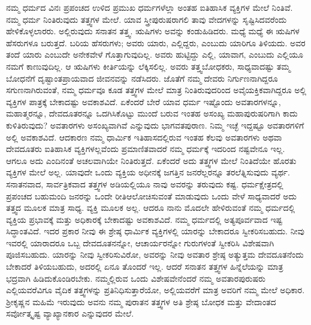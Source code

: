ನಮ್ಮ ಧರ್ಮದ ವಿನಃ ಪ್ರಪಂಚದ ಉಳಿದ ಪ್ರಮುಖ ಧರ್ಮಗಳೆಲ್ಲಾ ಅಂತಹ ಐತಿಹಾಸಿಕ ವ್ಯಕ್ತಿಗಳ ಮೇಲೆ ನಿಂತಿವೆ. ನಮ್ಮ ಧರ್ಮ ನಿಂತಿರುವುದು ತತ್ತ್ವಗಳ ಮೇಲೆ. ಯಾವ ಸ್ತ್ರೀಪುರುಷರಾಗಲಿ ತಾವು ವೇದಗಳನ್ನು ಸೃಷ್ಟಿಸಿದವರೆಂದು ಹೇಳಿಕೊಳ್ಳಲಾರರು. ಅಲ್ಲಿರುವುದು ಸನಾತನ ತತ್ತ್ವ. ಋಷಿಗಳು ಅವನ್ನು ಕಂಡುಹಿಡಿದರು. ಮಧ್ಯೆ ಮಧ್ಯೆ ಈ ಋಷಿಗಳ ಹೆಸರುಗಳೂ ಬರುತ್ತದೆ. ಬರಿಯ ಹೆಸರುಗಳು; ಅವರು ಯಾರು, ಎಲ್ಲಿದ್ದರು, ಎಂಬುದು ಯಾರಿಗೂ ತಿಳಿಯದು. ಅವರ ತಂದೆ ಯಾರು ಎಂಬುದೇ ಅನೇಕವೇಳೆ ಗೊತ್ತಾಗುವುದಿಲ್ಲ. ಅವರು ಹುಟ್ಟಿದ್ದು ಎಲ್ಲಿ, ಯಾವಾಗ, ಎಂಬುದು ಎಲ್ಲಿಯೂ ನಮಗೆ ಕಾಣುವುದಿಲ್ಲ. ಆ ಋಷಿಗಳು ಕೀರ್ತಿಯನ್ನು ಲೆಕ್ಕಿಸಲಿಲ್ಲ. ಅವರು ತತ್ತ್ವಬೋಧಕರು, ಸಾಧ್ಯವಾದಷ್ಟು ತಮ್ಮ ಬೋಧನೆಗೆ ದೃಷ್ಟಾಂತಪ್ರಾಯವಾದ ಜೀವನವನ್ನು ನಡೆಸಿದರು. ಜೊತೆಗೆ ನಮ್ಮ ದೇವರು ನಿರ್ಗುಣನಾಗಿದ್ದರೂ ಸಗುಣನಾಗಿರುವಂತೆ, ನಮ್ಮ ಧರ್ಮವೂ ಕೂಡ ತತ್ತ್ವಗಳ ಮೇಲೆ ಮಾತ್ರ ನಿಂತಿರುವುದರಿಂದ ಅವೈಯಕ್ತಿಕವಾಗಿದ್ದರೂ ಅಲ್ಲಿ ವ್ಯಕ್ತಿಗಳ ಪಾತ್ರಕ್ಕೆ ಬೇಕಾದಷ್ಟು ಅವಕಾಶವಿದೆ. ಏಕೆಂದರೆ ಬೇರೆ ಯಾವ ಧರ್ಮ ಇಷ್ಟೊಂದು ಅವತಾರಗಳನ್ನೂ, ಮಹಾತ್ಮರನ್ನೂ, ದೇವದೂತರನ್ನೂ ಒದಗಿಸಿಕೊಟ್ಟು ಮುಂದೆ ಬರುವ ಇಂತಹ ಅಸಂಖ್ಯ ಮಹಾಪುರುಷರಿಗಾಗಿ ಕಾದು ಕುಳಿತಿರುವುದು? ಅವತಾರಗಳು ಅಸಂಖ್ಯವಾಗಿವೆ ಎನ್ನುವುದು ಭಾಗವತಪುರಾಣ. ನಿಮ್ಮ ಇಚ್ಛೆ ಇದ್ದಷ್ಟೂ ಅವತಾರಗಳಿಗೆ ಅಲ್ಲಿ ಅವಕಾಶವಿದೆ. ಆದಕಾರಣ ನಮ್ಮ ಧಾರ್ಮಿಕ ಇತಿಹಾಸದಲ್ಲಿರುವ ಇಂತಹ ಕೆಲವು ಅವತಾರಗಳು ಅಥವಾ ದೇವದೂತರು ಐತಿಹಾಸಿಕ ವ್ಯಕ್ತಿಗಳಲ್ಲವೆಂದು ಪ್ರಮಾಣಿತವಾದರೆ ನಮ್ಮ ಧರ್ಮಕ್ಕೆ ಇದರಿಂದ ನಷ್ಟವೇನೂ ಇಲ್ಲ. ಆಗಲೂ ಅದು ಎಂದಿನಂತೆ ಅಚಲವಾಗಿಯೇ ನಿಂತಿರುತ್ತದೆ. ಏಕೆಂದರೆ ಅದು ತತ್ತ್ವಗಳ ಮೇಲೆ ನಿಂತಿದೆಯೇ ಹೊರತು ವ್ಯಕ್ತಿಗಳ ಮೇಲೆ ಅಲ್ಲ. ಯಾವುದೇ ಒಂದು ವ್ಯಕ್ತಿಯ ಅಧೀನಕ್ಕೆ ಜಗತ್ತಿನ ಜನರೆಲ್ಲರನ್ನೂ ತರಲೆತ್ನಿಸುವುದು ವ್ಯರ್ಥ. ಸನಾತನವಾದ, ಸಾರ್ವತ್ರಿಕವಾದ ತತ್ತ್ವಗಳ ಅಡಿಯಲ್ಲಿಯೂ ನಾವು ಅವರನ್ನು ತರುವುದು ಕಷ್ಟ. ಧರ್ಮಕ್ಷೇತ್ರದಲ್ಲಿ ಪ್ರಪಂಚದ ಬಹುಮಂದಿ ಜನರನ್ನು ಒಂದೇ ರೀತಿ\break ಆಲೋಚಿಸುವಂತೆ ಮಾಡುವುದು ಒಂದು ವೇಳೆ ಸಾಧ್ಯವಾದರೆ ಅದು ತತ್ತ್ವದ ಮೂಲಕ ಮಾತ್ರ ಸಾಧ್ಯ. ವ್ಯಕ್ತಿ ಮೂಲಕ ಅಲ್ಲ. ಆದರೂ ನಾನು ಮೊದಲೇ ಹೇಳಿರುವಂತೆ ನಮ್ಮ ಧರ್ಮದಲ್ಲಿ ವ್ಯಕ್ತಿಯ ಪ್ರಭಾವಕ್ಕೆ ಮತ್ತು ಅಧಿಕಾರಕ್ಕೆ ಬೇಕಾದಷ್ಟು ಅವಕಾಶವಿದೆ. ನಮ್ಮ ಧರ್ಮದಲ್ಲಿ ಅತ್ಯಪೂರ್ವವಾದ ಇಷ್ಟ ಸಿದ್ಧಾಂತವಿದೆ. ಇದರ ಪ್ರಕಾರ ನೀವು ಈ ಶ್ರೇಷ್ಠ ಧಾರ್ಮಿಕ ವ್ಯಕ್ತಿಗಳಲ್ಲಿ ಯಾರನ್ನು ಬೇಕಾದರೂ ಸ್ವೀಕರಿಸಬಹುದು. ನೀವು ಇವರಲ್ಲಿ ಯಾರಾದರೂ ಒಬ್ಬ ದೇವದೂತನನ್ನೋ, ಆಚಾರ್ಯರನ್ನೋ ಗುರುಗಳಂತೆ ಸ್ವೀಕರಿಸಿ ವಿಶೇಷವಾಗಿ ಪೂಜಿಸಬಹುದು. ಯಾರನ್ನು ನೀವು ಸ್ವೀಕರಿಸುವಿರೋ, ಅವರನ್ನು ನೀವು ಅವತಾರ ಶ್ರೇಷ್ಠ ಅತ್ಯುತ್ತಮ ದೇವದೂತನೆಂದು ಬೇಕಾದರೆ ತಿಳಿಯಬಹುದು, ಅದರಲ್ಲಿ ಏನೂ ತೊಂದರೆ ಇಲ್ಲ. ಆದರೆ ಸನಾತನ ತತ್ತ್ವಗಳ ಹಿನ್ನೆಲೆಯನ್ನು ಮಾತ್ರ ಭದ್ರವಾಗಿ ಹಿಡಿದುಕೊಂಡಿರಬೇಕು. ನಮ್ಮಲ್ಲಿರುವ ಒಂದು ವಿಶೇಷವೇನೆಂದರೆ ನಮ್ಮ ಅವತಾರಪುರುಷರು ಎಲ್ಲಿಯವರೆವಿಗೂ ವೈದಿಕ ತತ್ತ್ವಗಳನ್ನು ಪ್ರತಿನಿಧಿಸುತ್ತಾರೆಯೋ, ಅಲ್ಲಿಯವರೆಗೆ ಮಾತ್ರ ಅವರಿಗೆ ನಮ್ಮ ಮೇಲೆ ಅಧಿಕಾರ. ಶ‍್ರೀಕೃಷ್ಣನ ಮಹಿಮೆ ಇರುವುದು ಅವನು ನಮ್ಮ ಪುರಾತನ ತತ್ತ್ವಗಳ ಅತಿ ಶ್ರೇಷ್ಠ ಬೋಧಕ ಮತ್ತು ವೇದಾಂತದ ಸರ್ವೋತ್ಕೃಷ್ಟ ವ್ಯಾಖ್ಯಾನಕಾರ ಎನ್ನುವುದರ ಮೇಲೆ. 

